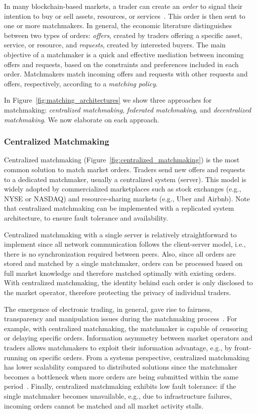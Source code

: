 In many blockchain-based markets, a trader can create an \emph{order} to signal their intention to buy or sell assets, resources, or services~\cite{veit2003matchmaking}.
This order is then sent to one or more matchmakers.
In general, the economic literature distinguishes between two types of orders: \emph{offers}, created by traders offering a specific asset, service, or resource, and \emph{requests}, created by interested buyers.
The main objective of a matchmaker is a quick and effective mediation between incoming offers and requests, based on the constraints and preferences included in each order.
Matchmakers match incoming offers and requests with other requests and offers, respectively, according to a \emph{matching policy}.

In Figure~\ref{fig:matching_architectures} we show three approaches for matchmaking: \emph{centralized matchmaking}, \emph{federated matchmaking}, and \emph{decentralized matchmaking}.
We now elaborate on each approach.

\subsubsection{Centralized Matchmaking}
Centralized matchmaking (Figure~\ref{fig:centralized_matchmaking}) is the most common solution to match market orders.
Traders send new offers and requests to a dedicated matchmaker, usually a centralized system (server).
This model is widely adopted by commercialized marketplaces such as stock exchanges (e.g., NYSE or NASDAQ) and resource-sharing markets (e.g., Uber and Airbnb).
Note that centralized matchmaking can be implemented with a replicated system architecture, to ensure fault tolerance and availability.

Centralized matchmaking with a single server is relatively straightforward to implement since all network communication follows the client-server model, i.e., there is no synchronization required between peers.
Also, since all orders are stored and matched by a single matchmaker, orders can be processed based on full market knowledge and therefore matched optimally with existing orders.
With centralized matchmaking, the identity behind each order is only disclosed to the market operator, therefore protecting the privacy of individual traders.

The emergence of electronic trading, in general, gave rise to fairness, transparency and manipulation issues during the matchmaking process~\cite{mavroudis2019libra}.
For example, with centralized matchmaking, the matchmaker is capable of censoring or delaying specific orders.
Information asymmetry between market operators and traders allows matchmakers to exploit their information advantage, e.g., by front-running on specific orders.
From a systems perspective, centralized matchmaking has lower scalability compared to distributed solutions since the matchmaker becomes a bottleneck when more orders are being submitted within the same period~\cite{sigdel2005centralized}.
Finally, centralized matchmaking exhibits low fault tolerance: if the single matchmaker becomes unavailable, e.g., due to infrastructure failures, incoming orders cannot be matched and all market activity stalls.

